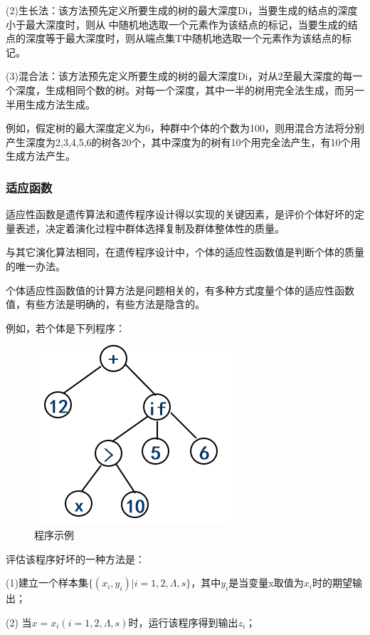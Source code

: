 \documentclass[UTF8]{ctexart}
\begin{document}
\begin{itemize}
		(2)生长法：该方法预先定义所要生成的树的最大深度Di，当要生成的结点的深度小于最大深度时，则从    中随机地选取一个元素作为该结点的标记，当要生成的结点的深度等于最大深度时，则从端点集T中随机地选取一个元素作为该结点的标记。
	
		(3)混合法：该方法预先定义所要生成的树的最大深度Di，对从2至最大深度的每一个深度，生成相同个数的树。对每一个深度，其中一半的树用完全法生成，而另一半用生成方法生成。
		
		例如，假定树的最大深度定义为6，种群中个体的个数为100，则用混合方法将分别产生深度为2,3,4,5,6的树各20个，其中深度为的树有10个用完全法产生，有10个用生成方法产生。
	\end{itemize}

\subsubsection{适应函数}
	适应性函数是遗传算法和遗传程序设计得以实现的关键因素，是评价个体好坏的定量表述，决定着演化过程中群体选择复制及群体整体性的质量。
	
	与其它演化算法相同，在遗传程序设计中，个体的适应性函数值是判断个体的质量的唯一办法。
	
	个体适应性函数值的计算方法是问题相关的，有多种方式度量个体的适应性函数值，有些方法是明确的，有些方法是隐含的。
	
	例如，若个体是下列程序：
	\begin{figure}[ht]
		\centering	
		\includegraphics[scale=0.3]{images/program.png}
		\caption{程序示例}
		\label{fig:label}
	\end{figure}

	评估该程序好坏的一种方法是：
	
	(1)建立一个样本集$\{(x_{i},y_{i})|i=1,2,\Lambda,s\}$，其中$y_{i}$是当变量x取值为$x_{i}$时的期望输出；
	
	(2) 当$x=x_{i}(i=1,2,\Lambda,s)$时，运行该程序得到输出$z_{i}$；
	
\end{document}
